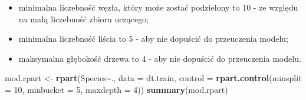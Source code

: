 \documentclass[
]{book}
\newenvironment{Shaded}{\begin{snugshade}}{\end{snugshade}}
\newcommand{\AttributeTok}[1]{\textcolor[rgb]{0.13,0.29,0.53}{#1}}
\newcommand{\DecValTok}[1]{\textcolor[rgb]{0.00,0.00,0.81}{#1}}
\newcommand{\FunctionTok}[1]{\textcolor[rgb]{0.13,0.29,0.53}{\textbf{#1}}}
\newcommand{\NormalTok}[1]{#1}
\newcommand{\OtherTok}[1]{\textcolor[rgb]{0.56,0.35,0.01}{#1}}
\newcommand{\SpecialCharTok}[1]{\textcolor[rgb]{0.81,0.36,0.00}{\textbf{#1}}}
\providecommand{\tightlist}{%
  \setlength{\itemsep}{0pt}\setlength{\parskip}{0pt}}
\theoremstyle{plain}
\theoremstyle{definition}
\theoremstyle{definition}
\theoremstyle{definition}
\theoremstyle{definition}
\theoremstyle{definition}
\theoremstyle{remark}
\begin{document}
\begin{itemize}
\tightlist
\item
  minimalna liczebność węzła, który może zostać podzielony to 10 - ze względu na małą liczebność zbioru uczącego;
\item
  minimalna liczebność liścia to 5 - aby nie dopuścić do przeuczenia modelu;
\item
  maksymalna głębokość drzewa to 4 - aby nie dopuścić do przeuczenia modelu.
\end{itemize}

\begin{Shaded}
\begin{Highlighting}[]
\NormalTok{mod.rpart }\OtherTok{\textless{}{-}} \FunctionTok{rpart}\NormalTok{(Species}\SpecialCharTok{\textasciitilde{}}\NormalTok{., }\AttributeTok{data =}\NormalTok{ dt.train, }
                   \AttributeTok{control =} \FunctionTok{rpart.control}\NormalTok{(}\AttributeTok{minsplit =} \DecValTok{10}\NormalTok{,}
                                           \AttributeTok{minbucket =} \DecValTok{5}\NormalTok{,}
                                           \AttributeTok{maxdepth =} \DecValTok{4}\NormalTok{))}
\FunctionTok{summary}\NormalTok{(mod.rpart)}
\end{Highlighting}
\end{Shaded}
\end{document}
